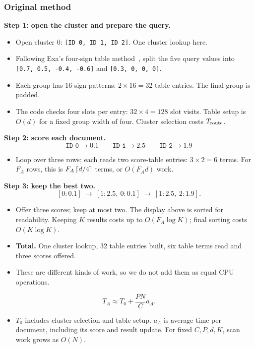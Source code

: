 \subsubsection{Original method}
\textbf{Step 1: open the cluster and prepare the query.}
\begin{itemize}
\item Open cluster 0: \texttt{[ID 0, ID 1, ID 2]}. One cluster lookup here.
\item Following Exa's four-sign table method~\cite{exa}, split the five query values into
\texttt{[0.7, 0.5, -0.4, -0.6]} and \texttt{[0.3, 0, 0, 0]}.
\item Each group has 16 sign patterns: $2\times16=32$ table entries. The final group is padded.
\item The code checks four slots per entry: $32\times4=128$ slot visits.
Table setup is $O(d)$ for a fixed group width of four. Cluster selection costs $T_{\rm route}$.
\end{itemize}

\textbf{Step 2: score each document.}
\[
 \texttt{ID 0}\longrightarrow0.1\qquad
 \texttt{ID 1}\longrightarrow2.5\qquad
 \texttt{ID 2}\longrightarrow1.9
\]
\begin{itemize}
\item Loop over three rows; each reads two score-table entries: $3\times2=6$ terms. For $F_A$ rows, this is $F_A\left\lceil d/4\right\rceil$ terms, or $O(F_A d)$ work.
\end{itemize}

\textbf{Step 3: keep the best two.}
\[
 [0{:}0.1]\ \longrightarrow\ [1{:}2.5,\ 0{:}0.1]
 \ \longrightarrow\ \boxed{[1{:}2.5,\ 2{:}1.9]}.
\]
\begin{itemize}
\item Offer three scores; keep at most two. The display above is sorted for readability. Keeping $K$ results costs up to $O(F_A\log K)$; final sorting costs $O(K\log K)$.
\end{itemize}

\begin{itemize}
\item \textbf{Total.} One cluster lookup, 32 table entries built, six table terms read and three scores offered.
\item These are different kinds of work, so we do not add them as equal CPU operations.
\end{itemize}
\[
 \boxed{T_A\approx T_0+\frac{PN}{C}a_A.}
\]
\begin{itemize}
\item $T_0$ includes cluster selection and table setup. $a_A$ is average time per document, including its score and result update. For fixed $C,P,d,K$, scan work grows as $O(N)$.
\end{itemize}

